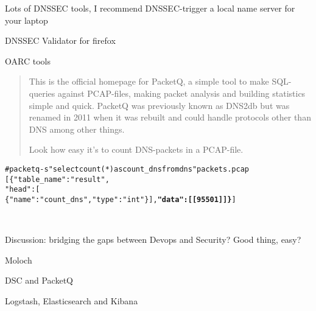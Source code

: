 \documentclass[20pt,landscape,a4paper,footrule]{foils}
\begin{document}

Lots of DNSSEC tools, I recommend DNSSEC-trigger a local name server for your laptop

\begin{list2}
\item DNSSEC Validator for firefox\\ 
\item OARC tools 
\item {}
\end{list2}



\begin{quote}
This is the official homepage for PacketQ, a simple tool to make SQL-queries against PCAP-files, making packet analysis and building statistics simple and quick. PacketQ was previously known as DNS2db but was renamed in 2011 when it was rebuilt and could handle protocols other than DNS among other things.

Look how easy it's to count DNS-packets in a PCAP-file.
\end{quote}

\begin{alltt}
\small
# packetq -s "select count(*) as count_dns from dns" packets.pcap 
[ \{ "table_name": "result",
      "head": [
      \{ "name": "count_dns","type": "int" \} ],   {\bf "data": [ [95501] ] \}} ]
\end{alltt}

\\



Discussion: bridging the gaps between Devops and Security? Good thing, easy?






\begin{list1}
\item Moloch 
\item DSC and PacketQ 
\item Logstash, Elasticsearch and Kibana
\end{list1}
\end{document}
